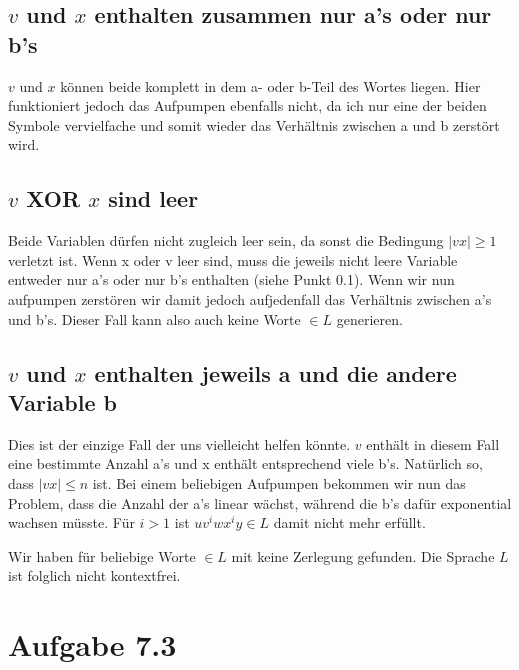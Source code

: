 \documentclass{article}
\begin{document}
\subsection{$v$ und $x$ enthalten zusammen nur a's oder nur b's}
$v$ und $x$ können beide komplett in dem a- oder b-Teil des Wortes liegen. Hier funktioniert jedoch das Aufpumpen ebenfalls nicht, da ich nur eine der beiden Symbole vervielfache und somit wieder das Verhältnis zwischen a und b zerstört wird.

\subsection{$v$ XOR $x$ sind leer}
Beide Variablen dürfen nicht zugleich leer sein, da sonst die Bedingung $|vx|\geq 1$ verletzt ist. Wenn x oder v leer sind, muss die jeweils nicht leere Variable entweder nur a's oder nur b's enthalten (siehe Punkt 0.1). Wenn wir nun aufpumpen zerstören wir damit jedoch aufjedenfall das Verhältnis zwischen a's und b's. Dieser Fall kann also auch keine Worte $\in L$ generieren.

\subsection{$v$ und $x$ enthalten jeweils a und die andere Variable b}
Dies ist der einzige Fall der uns vielleicht helfen könnte. $v$ enthält in diesem Fall eine bestimmte Anzahl a's und x enthält entsprechend viele b's. Natürlich so, dass $|vx| \leq n$ ist. Bei einem beliebigen Aufpumpen bekommen wir nun das Problem, dass die Anzahl der a's linear wächst, während die b's dafür exponential wachsen müsste. Für $i>1$ ist $uv^iwx^iy\in L$ damit nicht mehr erfüllt.

\bigskip

Wir haben für beliebige Worte $\in L$ mit  keine Zerlegung gefunden. Die Sprache $L$ ist folglich nicht kontextfrei.


\section*{Aufgabe 7.3}
\end{document}
